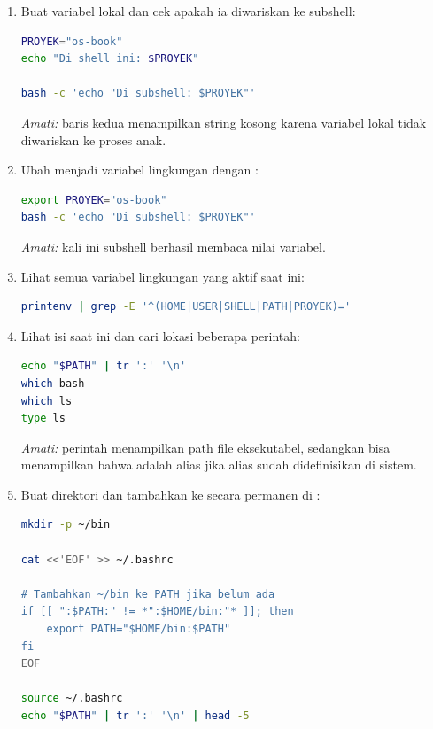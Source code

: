 \begin{enumerate}
    \item Buat variabel lokal dan cek apakah ia diwariskan ke subshell:
\begin{lstlisting}[language=bash, caption={Variabel lokal tidak diwariskan ke subshell}]
PROYEK="os-book"
echo "Di shell ini: $PROYEK"

bash -c 'echo "Di subshell: $PROYEK"'
\end{lstlisting}
    \textit{Amati:} baris kedua menampilkan string kosong karena variabel
    lokal tidak diwariskan ke proses anak.

    \item Ubah menjadi variabel lingkungan dengan :
\begin{lstlisting}[language=bash, caption={Variabel lingkungan diwariskan ke subshell}]
export PROYEK="os-book"
bash -c 'echo "Di subshell: $PROYEK"'
\end{lstlisting}
    \textit{Amati:} kali ini subshell berhasil membaca nilai variabel.

    \item Lihat semua variabel lingkungan yang aktif saat ini:
\begin{lstlisting}[language=bash, caption={Melihat variabel lingkungan}]
printenv | grep -E '^(HOME|USER|SHELL|PATH|PROYEK)='
\end{lstlisting}

    \item Lihat isi  saat ini dan cari lokasi beberapa perintah:
\begin{lstlisting}[language=bash, caption={Melihat PATH dan lokasi perintah}]
echo "$PATH" | tr ':' '\n'
which bash
which ls
type ls
\end{lstlisting}
    \textit{Amati:} perintah  menampilkan path file eksekutabel,
    sedangkan  bisa menampilkan bahwa  adalah alias
    jika alias sudah didefinisikan di sistem.

    \item Buat direktori  dan tambahkan ke  secara
          permanen di :
\begin{lstlisting}[language=bash, caption={Menambahkan ~/bin ke PATH}]
mkdir -p ~/bin

cat <<'EOF' >> ~/.bashrc

# Tambahkan ~/bin ke PATH jika belum ada
if [[ ":$PATH:" != *":$HOME/bin:"* ]]; then
    export PATH="$HOME/bin:$PATH"
fi
EOF

source ~/.bashrc
echo "$PATH" | tr ':' '\n' | head -5
\end{lstlisting}


\end{enumerate}
